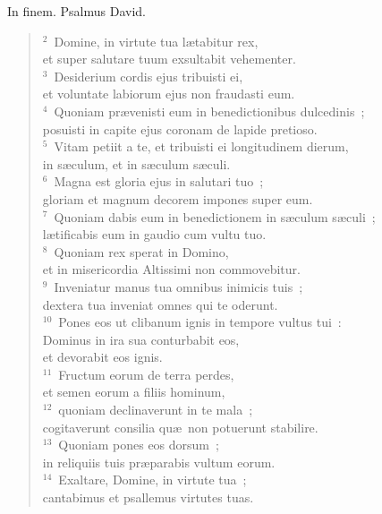 \bchapter
\lettrine[lines=3,image=true,loversize=0.05,lraise=-0.03]{I}{}n finem. Psalmus David.
\begin{flushleft}\begin{verse}\vspace{6pt}${}^{2}$~Domine, in virtute tua l\ae tabitur rex,\\ et super salutare tuum exsultabit vehementer.\\
${}^{3}$~Desiderium cordis ejus tribuisti ei,\\ et voluntate labiorum ejus non fraudasti eum.\\
${}^{4}$~Quoniam pr\ae venisti eum in benedictionibus dulcedinis~;\\ posuisti in capite ejus coronam de lapide pretioso.\\
${}^{5}$~Vitam petiit a te, et tribuisti ei longitudinem dierum,\\ in s\ae culum, et in s\ae culum s\ae culi.\\
${}^{6}$~Magna est gloria ejus in salutari tuo~;\\ gloriam et magnum decorem impones super eum.\\
${}^{7}$~Quoniam dabis eum in benedictionem in s\ae culum s\ae culi~;\\ l\ae tificabis eum in gaudio cum vultu tuo.\\
${}^{8}$~Quoniam rex sperat in Domino,\\ et in misericordia Altissimi non commovebitur.\\
${}^{9}$~Inveniatur manus tua omnibus inimicis tuis~;\\ dextera tua inveniat omnes qui te oderunt.\\
${}^{10}$~Pones eos ut clibanum ignis in tempore vultus tui~:\\ Dominus in ira sua conturbabit eos,\\ et devorabit eos ignis.\\
${}^{11}$~Fructum eorum de terra perdes,\\ et semen eorum a filiis hominum,\\
${}^{12}$~quoniam declinaverunt in te mala~;\\ cogitaverunt consilia qu\ae\ non potuerunt stabilire.\\
${}^{13}$~Quoniam pones eos dorsum~;\\ in reliquiis tuis pr\ae parabis vultum eorum.\\
${}^{14}$~Exaltare, Domine, in virtute tua~;\\ cantabimus et psallemus virtutes tuas.\end{verse}\end{flushleft}



